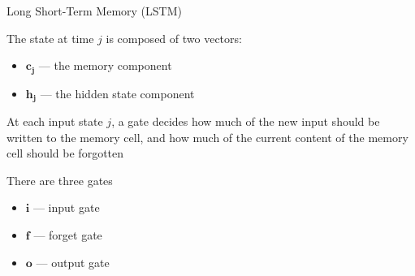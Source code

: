 \documentclass[12pt,aspectratio=169,handout]{beamer}
\begin{document}
\begin{frame}{Long Short-Term Memory (LSTM)}

The state at time $j$ is composed of two vectors:
\begin{itemize}
	\item $\bm{c_j}$ --- the memory component
	\item $\bm{h_j}$ --- the hidden state component
\end{itemize}

\pause
At each input state $j$, a gate decides how much of the new input should be written to the memory cell, and how much of the current content of the memory cell should be forgotten

\pause
There are three gates
\begin{itemize}
	\item $\bm{i}$ --- input gate
	\item $\bm{f}$ --- forget gate
	\item $\bm{o}$ --- output gate
\end{itemize}

	
\end{frame}
\end{document}
